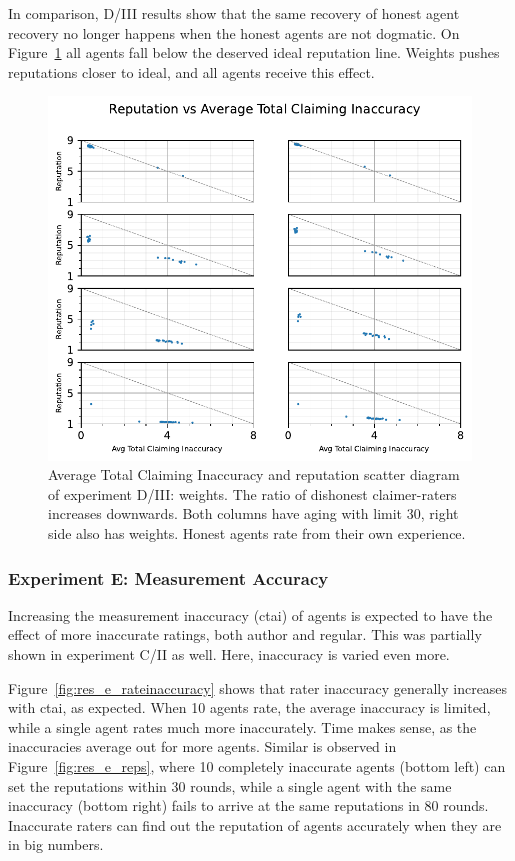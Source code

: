 \documentclass[%
    ]{\PathToTumTemplate/thesis/tum_thesis}
\begin{document}
In comparison, D/III results show that the same recovery of honest agent recovery no longer happens when the honest agents are not dogmatic.
On Figure~\ref{fig:res_d3_scatter} all agents fall below the deserved ideal reputation line.
Weights pushes reputations closer to ideal, and all agents receive this effect.

\begin{figure}[tbp]
  \begin{center}
        \includegraphics[width=0.75\linewidth]	{../results/d3/AvgTotClaimInaccuracyAndReputationScatter_joined.pdf}
    \caption{
    Average Total Claiming Inaccuracy and reputation scatter diagram of experiment D/III: weights.
    The ratio of dishonest claimer-raters increases downwards.
    Both columns have aging with limit 30, right side also has weights.
    Honest agents rate from their own experience.
    }
    \label{fig:res_d3_scatter}
  \end{center}
\end{figure}

\subsubsection{Experiment E: Measurement Accuracy}
Increasing the measurement inaccuracy (\gls{ctai}) of agents is expected to have the effect of more inaccurate ratings, both author and regular.
This was partially shown in experiment C/II as well.
Here, inaccuracy is varied even more.

Figure~\ref{fig:res_e_rateinaccuracy} shows that rater inaccuracy generally increases with \gls{ctai}, as expected.
When 10 agents rate, the average inaccuracy is limited, while a single agent rates much more inaccurately.
Time makes sense, as the inaccuracies average out for more agents.
Similar is observed in Figure~\ref{fig:res_e_reps}, where 10 completely inaccurate agents (bottom left) can set the reputations within 30 rounds, while a single agent with the same inaccuracy (bottom right) fails to arrive at the same reputations in 80 rounds.
Inaccurate raters can find out the reputation of agents accurately when they are in big numbers.
\end{document}
